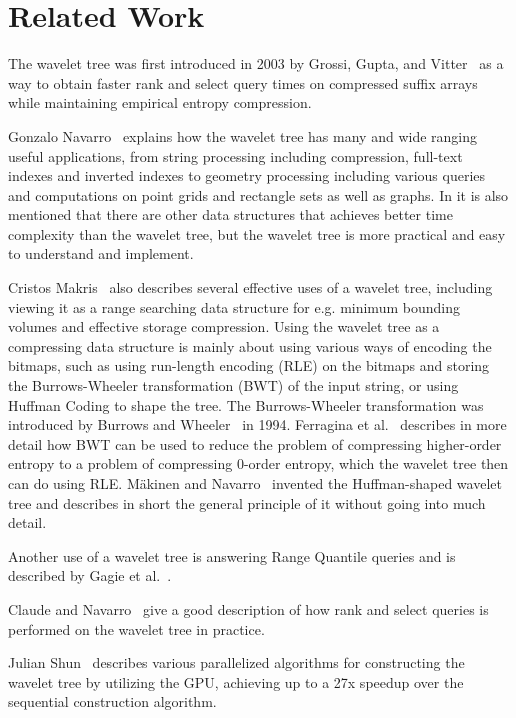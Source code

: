 \section{Related Work}
The wavelet tree was first introduced in 2003 by Grossi, Gupta, and Vitter~ as a way to obtain faster rank and select query times on compressed suffix arrays while maintaining empirical entropy compression.

Gonzalo Navarro~ explains how the wavelet tree has many and wide ranging useful applications, from string processing including compression, full-text indexes and inverted indexes to geometry processing including various queries and computations on point grids and rectangle sets as well as graphs. 
In  it is also mentioned that there are other data structures that achieves better time complexity than the wavelet tree, but the wavelet tree is more practical and easy to understand and implement.

Cristos Makris~ also describes several effective uses of a wavelet tree, including viewing it as a range searching data structure for e.g. minimum bounding volumes and effective storage compression.
Using the wavelet tree as a compressing data structure is mainly about using various ways of encoding the bitmaps, such as using run-length encoding (RLE) on the bitmaps and storing the Burrows-Wheeler transformation (BWT) of the input string, or using Huffman Coding to shape the tree.
The Burrows-Wheeler transformation was introduced by Burrows and Wheeler~ in 1994.
Ferragina et al.~ describes in more detail how BWT can be used to reduce the problem of compressing higher-order entropy to a problem of compressing 0-order entropy, which the wavelet tree then can do using RLE.
Mäkinen and Navarro~ invented the Huffman-shaped wavelet tree and describes in short the general principle of it without going into much detail.

Another use of a wavelet tree is answering Range Quantile queries and is described by Gagie et al.~.

Claude and Navarro~ give a good description of how rank and select queries is performed on the wavelet tree in practice.

Julian Shun~ describes various parallelized algorithms for constructing the wavelet tree by utilizing the GPU, achieving up to a 27x speedup over the sequential construction algorithm.

